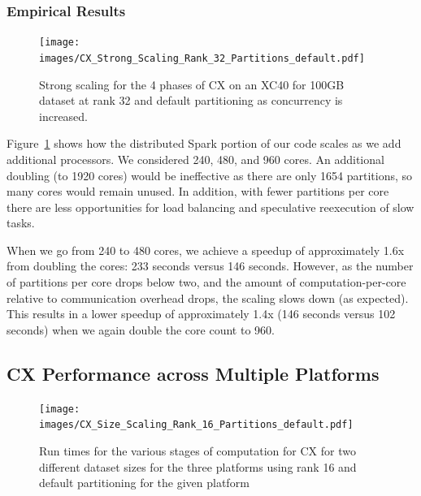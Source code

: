   \subsubsection{Empirical Results}

    \begin{figure} [H]
    \begin{centering}
    \texttt{[image: images/CX\_Strong\_Scaling\_Rank\_32\_Partitions\_default.pdf]}
    \end{centering}
    \caption{ Strong scaling for the 4 phases of CX on an XC40 for 100GB dataset at rank 32 and default partitioning as concurrency is increased.} 
    \label{fig:xc40scaling}
    \end{figure} 

Figure~\ref{fig:xc40scaling} shows how the distributed Spark portion of our code scales as we add additional processors.  We considered 240, 480, and 960 cores.  An additional doubling (to 1920 cores) would be ineffective as there are only 1654 partitions, so many cores would remain unused.  In addition, with fewer partitions per core there are less opportunities for load balancing and speculative reexecution of slow tasks.

When we go from 240 to 480 cores, we achieve a speedup of approximately 1.6x from doubling the cores: 233 seconds versus 146 seconds.  However, as the number of partitions per core drops below two, and the amount of computation-per-core relative to communication overhead drops, the scaling slows down (as expected).  This results in a lower speedup of approximately 1.4x (146 seconds versus 102 seconds) when we again double the core count to 960.

  \subsection{CX Performance across Multiple Platforms}
  \label{sect:h2h}
    
    \begin{figure} [H]
    \begin{centering}
    \texttt{[image: images/CX\_Size\_Scaling\_Rank\_16\_Partitions\_default.pdf]}
    \end{centering}
    \caption{ Run times for the various stages of computation for CX for two different dataset sizes for the three platforms using rank 16 and default partitioning for the given platform} 
    \label{fig:h2hrank16} 
    \end{figure}

